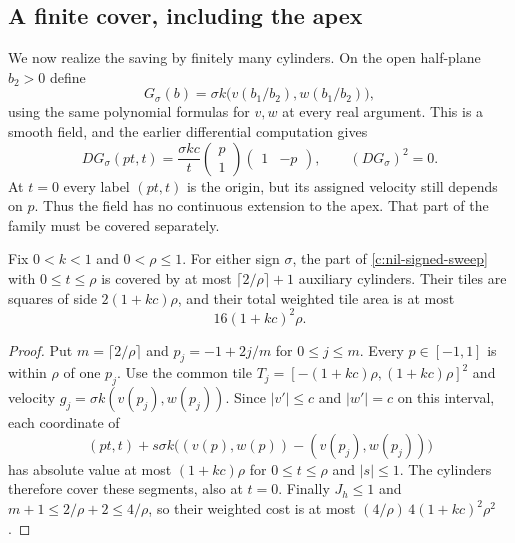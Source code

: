 \subsection{A finite cover, including the apex}

We now realize the saving by finitely many cylinders.  On the open
half-plane $b_2>0$ define
\[
 G_\sigma(b)=\sigma k
 \bigl(v(b_1/b_2),w(b_1/b_2)\bigr),
\]
using the same polynomial formulas for $v,w$ at every real argument.
This is a smooth field, and the earlier differential computation gives
\begin{equation}\label{c:nil-rank-one}
 DG_\sigma(pt,t)=\frac{\sigma kc}{t}
 \begin{pmatrix}p\\1\end{pmatrix}
 \begin{pmatrix}1&-p\end{pmatrix},
 \qquad (DG_\sigma)^2=0.
\end{equation}
At $t=0$ every label $(pt,t)$ is the origin, but its assigned
velocity still depends on $p$.  Thus the field has no continuous
extension to the apex.  That part of the family must be covered
separately.

\begin{lemma}\label{c:nil-apex-net}
Fix $0<k<1$ and $0<\rho\le1$.  For either sign $\sigma$, the
part of \eqref{c:nil-signed-sweep} with $0\le t\le\rho$ is
covered by at most $\lceil2/\rho\rceil+1$ auxiliary cylinders.
Their tiles are squares of side $2(1+kc)\rho$, and their total
weighted tile area is at most
\begin{equation}\label{c:nil-apex-cost}
 16(1+kc)^2\rho.
\end{equation}
\end{lemma}

\begin{proof}
Put $m=\lceil2/\rho\rceil$ and $p_j=-1+2j/m$ for
$0\le j\le m$.  Every $p\in[-1,1]$ is within $\rho$ of one
$p_j$.  Use the common tile
$T_j=[-(1+kc)\rho,(1+kc)\rho]^2$ and velocity
$g_j=\sigma k(v(p_j),w(p_j))$.
Since $|v'|\le c$ and $|w'|=c$ on this interval, each coordinate
of
\[
 (pt,t)+s\sigma k\bigl((v(p),w(p))-(v(p_j),w(p_j))\bigr)
\]
has absolute value at most $(1+kc)\rho$ for
$0\le t\le\rho$ and $|s|\le1$.  The cylinders therefore
cover these segments, also at $t=0$.  Finally $J_h\le1$ and
$m+1\le2/\rho+2\le4/\rho$, so their weighted cost is at most
$(4/\rho)\,4(1+kc)^2\rho^2$.
\end{proof}

